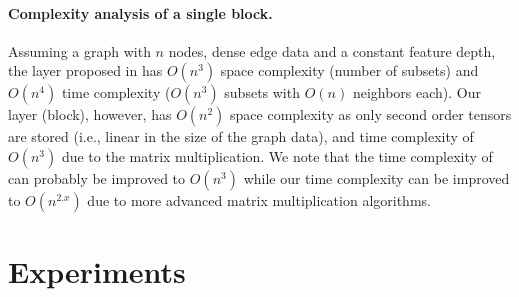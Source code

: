 \documentclass{article}
\newcommand{\revision}[1]{{\color{black} #1}}
\begin{document}
\revision{ \paragraph{Complexity analysis of a single block.}  Assuming a graph with $n$ nodes, dense edge data and a
constant feature depth, the layer proposed in \cite{morris2018weisfeiler} has $O(n^3)$ space complexity (number of subsets) and $O(n^4)$ time complexity ($O(n^3)$ subsets with $O(n)$ neighbors each). Our layer (block), however, has $O(n^2)$ space complexity as only second order tensors are stored (i.e., linear in the size of the graph data), and time complexity of $O(n^3)$ due to the matrix multiplication. We note that the time complexity of \cite{morris2018weisfeiler} can probably be improved to $O(n^3)$ while our time complexity can be improved to $O(n^{2.x})$ due to more advanced matrix multiplication algorithms. }





\section{Experiments}
\end{document}
